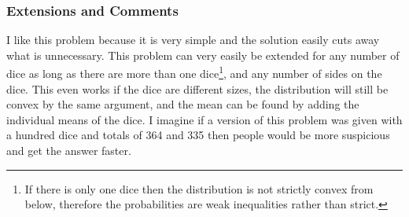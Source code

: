 \subsubsection{Extensions and Comments}

I like this problem because it is very simple and the solution easily cuts away what is unnecessary. This problem can very easily be extended for any number of dice as long as there are more than one dice\footnote{If there is only one dice then the distribution is not strictly convex from below, therefore the probabilities are weak inequalities rather than strict.}, and any number of sides on the dice. This even works if the dice are different sizes, the distribution will still be convex by the same argument, and the mean can be found by adding the individual means of the dice. I imagine if a version of this problem was given with a hundred dice and totals of 364 and 335 then people would be more suspicious and get the answer faster.